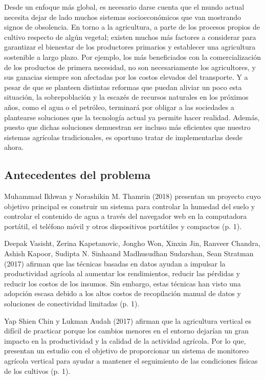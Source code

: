\documentclass{report}
\begin{document}
Desde un enfoque más global, es necesario darse cuenta que el mundo actual
necesita dejar de lado muchos sistemas socioeconómicos que van mostrando signos
de obsolencia. En torno a la agricultura, a parte de los procesos propios de
cultivo respecto de algún vegetal; existen muchos más factores a considerar para
garantizar el bienestar de los productores primarios y establecer una
agricultura sostenible a largo plazo. Por ejemplo, los más beneficiados con la
comercialización de los productos de primera necesidad, no son necesariamente
los agricultores, y sus ganacias siempre son afectadas por los costos elevados
del transporte. Y a pesar de que se planteen distintas reformas que puedan
aliviar un poco esta situación, la sobrepoblación y la escazés de recursos
naturales en los próximos años, como el agua o el petróleo, terminará por
obligar a las sociedades a plantearse soluciones que la tecnología actual ya
permite hacer realidad. Además, puesto que dichas soluciones demuestran ser
incluso más eficientes que nuestro sistemas agrícolas tradicionales, es oportuno
tratar de implementarlas desde ahora.
\subsection{Antecedentes del problema}
Muhammad Ikhwan y Norashikin M. Thamrin (2018) presentan un proyecto cuyo
objetivo principal es construir un sistema para controlar la humedad del suelo y
controlar el contenido de agua a través del navegador web en la computadora
portátil, el teléfono móvil y otros dispositivos portátiles y compactos (p. 1).

Deepak Vasisht, Zerina Kapetanovic, Jongho Won, Xinxin Jin, Ranveer Chandra,
Ashish Kapoor, Sudipta N. Sinhaand Madhusudhan Sudarshan, Sean Stratman (2017)
afirman que las técnicas basadas en datos ayudan a impulsar la productividad
agrícola al aumentar los rendimientos, reducir las pérdidas y reducir los costos
de los insumos. Sin embargo, estas técnicas han visto una adopción escasa debido
a los altos costos de recopilación manual de datos y soluciones de conectividad
limitadas (p. 1).

Yap Shien Chin y Lukman Audah (2017) afirman que la agricultura vertical es
difícil de practicar porque los cambios menores en el entorno dejarían un gran
impacto en la productividad y la calidad de la actividad agrícola. Por lo que,
presentan un estudio con el objetivo de proporcionar un sistema de monitoreo
agrícola vertical para ayudar a mantener el seguimiento de las condiciones
físicas de los cultivos (p. 1).
\end{document}
